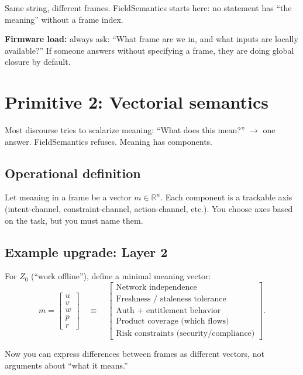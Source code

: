 \documentclass[11pt]{article}
\begin{document}
Same string, different frames. FieldSemantics starts here: no statement has ``the meaning'' without a frame index.

\textbf{Firmware load:} always ask: ``What frame are we in, and what inputs are locally available?'' If someone answers without specifying a frame, they are doing global closure by default.

\section{Primitive 2: Vectorial semantics}

Most discourse tries to scalarize meaning: ``What does this mean?'' $\rightarrow$ one answer. FieldSemantics refuses. Meaning has components.

\subsection{Operational definition}

Let meaning in a frame be a vector $m \in \mathbb{R}^n$. Each component is a trackable axis (intent-channel, constraint-channel, action-channel, etc.). You choose axes based on the task, but you must name them.

\subsection{Example upgrade: Layer 2}

For $Z_0$ (``work offline''), define a minimal meaning vector:
\[
  m =
  \begin{bmatrix}
    u\\ v\\ w\\ p\\ r
  \end{bmatrix}
  \quad\equiv\quad
  \begin{bmatrix}
    \text{Network independence}\\
    \text{Freshness / staleness tolerance}\\
    \text{Auth + entitlement behavior}\\
    \text{Product coverage (which flows)}\\
    \text{Risk constraints (security/compliance)}
  \end{bmatrix}.
\]

Now you can express differences between frames as different vectors, not arguments about ``what it means.''
\end{document}
